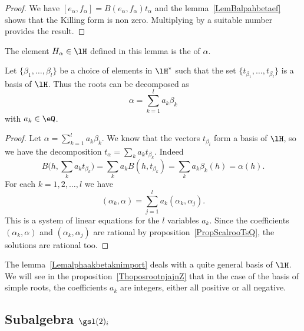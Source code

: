 \begin{proof}
	We have \( [e_{\alpha},f_{\alpha}]=B(e_{\alpha},f_{\alpha})t_{\alpha}\) and the lemma~\ref{LemBalpahbetaef} shows that the Killing form is non zero. Multiplying by a suitable number provides the result.
\end{proof}
The element \( H_{\alpha}\in\lH\) defined in this lemma is the  of \( \alpha\).

\begin{lemma}       \label{Lemalphaakbetaknimport}
	Let \( \{ \beta_1,\ldots,\beta_l \}\) be a choice of elements in \( \lH^*\) such that the set \( \{ t_{\beta_1},\ldots,t_{\beta_l} \}\) is a basis of \( \lH\). Thus the roots can be decomposed as
	\begin{equation}
		\alpha=\sum_{k=1}^la_k\beta_k
	\end{equation}
	with \( a_k\in\eQ\).
\end{lemma}

\begin{proof}

	Let \( \alpha=\sum_{k=1}^la_k\beta_k\). We know that the vectors \( t_{\beta_i}\) form a basis of \( \lH\), so we have the decomposition \( t_{\alpha}=\sum_ka_kt_{\beta_k}\). Indeed
	\begin{equation}
		B\big( h,\sum_k a_kt_{\beta_k} \big)=\sum_ka_k B(h,t_{\beta_k})=\sum_ka_k\beta_k(h)=\alpha(h).
	\end{equation}
	For each \( k=1,2,\ldots,l\) we have
	\begin{equation}
		(\alpha_k, \alpha) =\sum_{j=1}^la_k(\alpha_k, \alpha_j).
	\end{equation}
	This is a system of linear equations for the \( l\) variables \( a_k\). Since the coefficients \( (\alpha_k,\alpha)\) and \( (\alpha_k,\alpha_j)\) are rational by proposition~\ref{PropScalrooTsQ}, the solutions are rational too.
\end{proof}

\begin{remark}
	The lemma~\ref{Lemalphaakbetaknimport} deals with a quite general basis of \( \lH\). We will see in the proposition~\ref{ThoposrootnjajnZ} that in the case of the basis of simple roots, the coefficients \( a_k\) are integers, either all positive or all negative.
\end{remark}

\subsection{Subalgebra \texorpdfstring{$ \gsl(2)_i$}{SL2R} }
\label{SubSecCopiedeSLdansGi}

